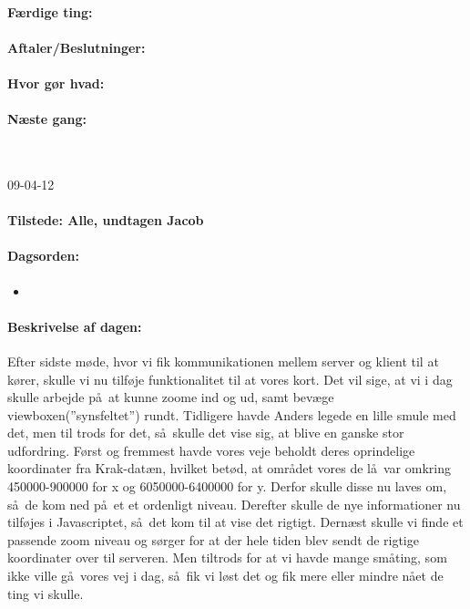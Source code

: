 \documentclass[a4paper,10pt,titlepage]{article}
\begin{document}
		\paragraph{F\ae rdige ting:}
		
		\paragraph{Aftaler/Beslutninger:}
		
		\paragraph{Hvor g\o r hvad:}
		
		\paragraph{N\ae ste gang:}\mbox{}\\
		
		\begin{center}
		09-04-12
		\end{center}
		
		\paragraph{Tilstede: Alle, undtagen Jacob}
		\paragraph{Dagsorden:}
		\begin{itemize}
					\item 
					
		\end{itemize}
		
		\paragraph{Beskrivelse af dagen:}
		Efter sidste m\o de, hvor vi fik kommunikationen mellem server og klient til at k\o rer, skulle vi nu tilf\o je funktionalitet til at vores kort. Det vil sige, at vi i dag skulle arbejde p\aa \ at kunne zoome ind og ud, samt bev\ae ge viewboxen(”synsfeltet”) rundt. Tidligere havde Anders legede en lille smule med det, men til trods for det, s\aa \ skulle det vise sig, at blive en ganske stor udfordring. F\o rst og fremmest havde vores veje beholdt deres oprindelige koordinater fra Krak-dat\ae n, hvilket bet\o d, at omr\aa det vores de l\aa \ var omkring 450000-900000 for x og 6050000-6400000 for y. Derfor skulle disse nu laves om, s\aa \ de kom ned p\aa \ et et ordenligt niveau. Derefter skulle de nye informationer nu tilf\o jes i Javascriptet, s\aa \ det kom til at vise det rigtigt. Dern\ae st skulle vi finde et passende zoom niveau og s\o rger for at der hele tiden blev sendt de rigtige koordinater over til serveren. Men tiltrods for at vi havde mange sm\aa ting, som ikke ville g\aa \ vores vej i dag, s\aa \ fik vi l\o st det og fik mere eller mindre n\aa et de ting vi skulle. 
\end{document}

